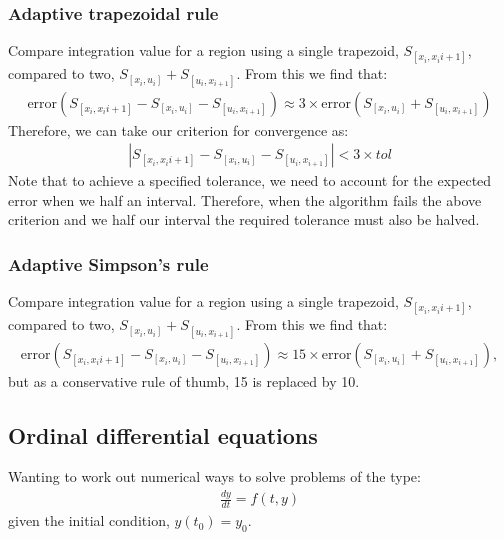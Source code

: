 \documentclass[11pt,a4paper]{report}
\begin{document}
    	\subsubsection{Adaptive trapezoidal rule}
    		Compare integration value for a region using a single trapezoid, $S_{[x_i,x_i{i+1}]}$, compared to two, $S_{[x_i,u_i]} + S_{[u_i,x_{i+1}]}$. From this we find that:
    		\begin{align}
    			\text{error}(S_{[x_i,x_i{i+1}]} - S_{[x_i,u_i]} - S_{[u_i,x_{i+1}]}) \approx 3\times \text{error} (S_{[x_i,u_i]} + S_{[u_i,x_{i+1}]})
    		\end{align}
    		Therefore, we can take our criterion for convergence as:
    		\begin{align}
    			| S_{[x_i,x_i{i+1}]} - S_{[x_i,u_i]} - S_{[u_i,x_{i+1}]} | < 3\times tol
    		\end{align}
    		Note that to achieve a specified tolerance, we need to account for the expected error when we half an interval. Therefore, when the algorithm fails the above criterion and we half our interval the required tolerance must also be halved.
    		
		\subsubsection{Adaptive Simpson's rule}
		    Compare integration value for a region using a single trapezoid, $S_{[x_i,x_i{i+1}]}$, compared to two, $S_{[x_i,u_i]} + S_{[u_i,x_{i+1}]}$. From this we find that:
			\begin{align}
				\text{error}(S_{[x_i,x_i{i+1}]} - S_{[x_i,u_i]} - S_{[u_i,x_{i+1}]}) \approx 15\times \text{error} (S_{[x_i,u_i]} + S_{[u_i,x_{i+1}]}),
			\end{align}
			but as a conservative rule of thumb, 15 is replaced by 10.
			
		\subsection{Ordinal differential equations}
			Wanting to work out numerical ways to solve problems of the type:
			\begin{align}
				\frac{dy}{dt} = f(t,y)
			\end{align}
			given the initial condition, $y(t_0)=y_0$. \\
			
\end{document}
